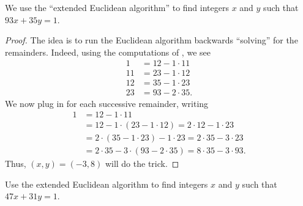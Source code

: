 \documentclass[../notes.tex]{subfiles}
\begin{document}
\begin{example}
	We use the ``extended Euclidean algorithm'' to find integers $x$ and $y$ such that $93x+35y=1$.
\end{example}
\begin{proof}
	The idea is to run the Euclidean algorithm backwards ``solving'' for the remainders. Indeed, using the computations of , we see
	\begin{align*}
		1 &= 12-1\cdot11 \\
		11 &= 23-1\cdot12 \\
		12 &= 35-1\cdot23 \\
		23 &= 93-2\cdot35.
	\end{align*}
	We now plug in for each successive remainder, writing
	\begin{align*}
		1 &= 12-1\cdot11 \\
		&= 12-1\cdot(23-1\cdot12) = 2\cdot12-1\cdot23 \\
		&= 2\cdot(35-1\cdot23)-1\cdot23 = 2\cdot35-3\cdot23 \\
		&= 2\cdot35-3\cdot(93-2\cdot35) = 8\cdot35-3\cdot93.
	\end{align*}
	Thus, $(x,y)=(-3,8)$ will do the trick.
\end{proof}
\begin{exe}
	Use the extended Euclidean algorithm to find integers $x$ and $y$ such that $47x+31y=1$.
\end{exe}
\end{document}
